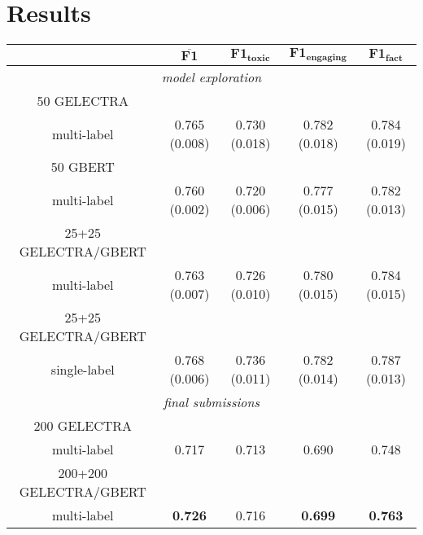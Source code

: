 \documentclass[11pt,a4paper]{article}
\begin{document}
\section{Results}

\begin{table*}
    \begin{center}
      \begin{tabular}{c|c|c|c|c}
          & $\mathbf{\overline{F1}}$ & $\mathbf{F1_{toxic}}$ & $\mathbf{F1_{engaging}}$ & $\mathbf{F1_{fact}}$\\
          \hline
          \multicolumn{5}{c}{\textit{model exploration}}\\
          \hline

          50 GELECTRA & & & & \\
          multi-label & 0.765 (0.008) & 0.730 (0.018) & 0.782 (0.018) & 0.784 (0.019) \\
          \hline

          50 GBERT & & & & \\
          multi-label & 0.760 (0.002) & 0.720 (0.006) & 0.777 (0.015) & 0.782 (0.013) \\
          \hline

          25+25 GELECTRA/GBERT & & & & \\
          multi-label & 0.763 (0.007) & 0.726 (0.010) & 0.780 (0.015) & 0.784 (0.015) \\
          \hline

          25+25 GELECTRA/GBERT & & & & \\
          single-label & 0.768 (0.006) & 0.736 (0.011) & 0.782 (0.014) & 0.787 (0.013) \\
          \hline
          \hline
          \multicolumn{5}{c}{\textit{final submissions}}\\
          \hline

          200 GELECTRA & & & & \\
          multi-label & 0.717 & 0.713 & 0.690 & 0.748 \\
          \hline

          200+200 GELECTRA/GBERT & & & & \\
          multi-label & \textbf{0.726} & 0.716 & \textbf{0.699} & \textbf{0.763} \\
          \hline


\end{tabular}
\end{center}
\end{table*}
\end{document}
